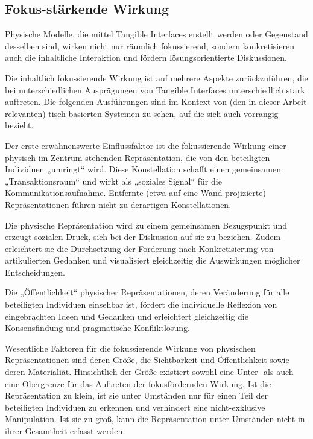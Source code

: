 
\subsection{Fokus-stärkende Wirkung} %
\label{sub:fokus_stärkende_wirkung}

Physische Modelle, die mittel Tangible Interfaces erstellt werden oder Gegenstand desselben sind, wirken nicht nur räumlich fokussierend, sondern konkretisieren auch die inhaltliche Interaktion und fördern lösungsorientierte Diskussionen.

Die inhaltlich fokussierende Wirkung ist auf mehrere Aspekte zurückzuführen, die bei unterschiedlichen Ausprägungen von Tangible Interfaces unterschiedlich stark auftreten. Die folgenden Ausführungen sind im Kontext von (den in dieser Arbeit relevanten) tisch-basierten Systemen zu sehen, auf die sich auch \citet{Hornecker04} vorrangig bezieht.

Der erste erwähnenswerte Einflussfaktor ist die fokussierende Wirkung einer physisch im Zentrum stehenden Repräsentation, die von den beteiligten Individuen „umringt“ wird. Diese Konstellation schafft einen gemeinsamen „Transaktionsraum“ und wirkt als „soziales Signal“ für die Kommunikationsaufnahme. Entfernte (etwa auf eine Wand projizierte) Repräsentationen führen nicht zu derartigen Konstellationen.

Die physische Repräsentation wird zu einem gemeinsamen Bezugspunkt und erzeugt sozialen Druck, sich bei der Diskussion auf sie zu beziehen. Zudem erleichtert sie die Durchsetzung der Forderung nach Konkretisierung von artikulierten Gedanken und visualisiert gleichzeitig die Auswirkungen möglicher Entscheidungen.

Die „Öffentlichkeit“ physischer Repräsentationen, deren Veränderung für alle beteiligten Individuen einsehbar ist, fördert die individuelle Reflexion von eingebrachten Ideen und Gedanken und erleichtert gleichzeitig die Konsensfindung und pragmatische Konfliktlösung.

Wesentliche Faktoren für die fokussierende Wirkung von physischen Repräsentationen sind deren Größe, die Sichtbarkeit und Öffentlichkeit sowie deren Materialiät. Hinsichtlich der Größe existiert sowohl eine Unter- als auch eine Obergrenze für das Auftreten der fokusfördernden Wirkung. Ist die Repräsentation zu klein, ist sie unter Umständen nur für einen Teil der beteiligten Individuen zu erkennen und verhindert eine nicht-exklusive Manipulation. Ist sie zu groß, kann die Repräsentation unter Umständen nicht in ihrer Gesamtheit erfasst werden. 

